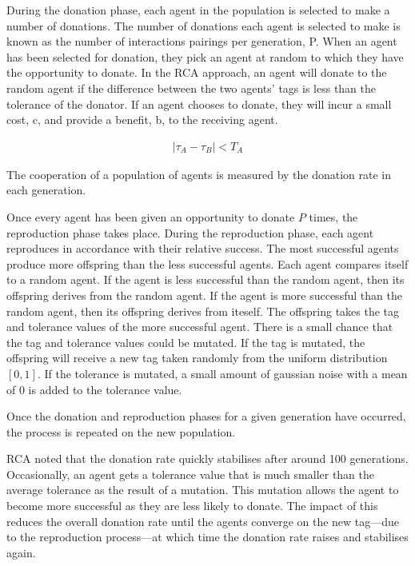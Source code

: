 During the donation phase, each agent in the population is selected
to make a number of donations.  The number of donations each agent
is selected to make is known as the number of interactions pairings
per generation, P.  When an agent has been selected for donation,
they pick an agent at random to which they have the opportunity to
donate.  In the RCA approach, an agent will donate to the random
agent if the difference between the two agents' tags is less than
the tolerance of the donator.  If an agent chooses to donate, they
will incur a small cost, c, and provide a benefit, b, to the receiving
agent.

\begin{align*}
    |\tau_A - \tau_B| < T_A
\end{align*}

The cooperation of a population of agents is measured by the donation rate in each generation.

Once every agent has been given an opportunity to donate $P$ times,
the reproduction phase takes place.  During the reproduction phase,
each agent reproduces in accordance with their relative success.
The most successful agents produce more offspring than the less
successful agents.  Each agent compares itself to a random agent.
If the agent is less successful than the random agent, then its
offspring derives from the random agent.  If the agent is more
successful than the random agent, then its offspring derives from
iteself.  The offspring takes the tag and tolerance values of the
more successful agent.  There is a small chance that the tag and
tolerance values could be mutated.  If the tag is mutated, the
offspring will receive a new tag taken randomly from the uniform
distribution $\left[0, 1\right]$.  If the tolerance is mutated, a
small amount of gaussian noise with a mean of $0$ is added to the
tolerance value.

Once the donation and reproduction phases for a given generation
have occurred, the process is repeated on the new population.

RCA noted that the donation rate quickly stabilises after around
100 generations.  Occasionally, an agent gets a tolerance value
that is much smaller than the average tolerance as the result of a
mutation.  This mutation allows the agent to become more successful
as they are less likely to donate.  The impact of this reduces the
overall donation rate until the agents converge on the new tag---due
to the reproduction process---at which time the donation rate raises
and stabilises again.

